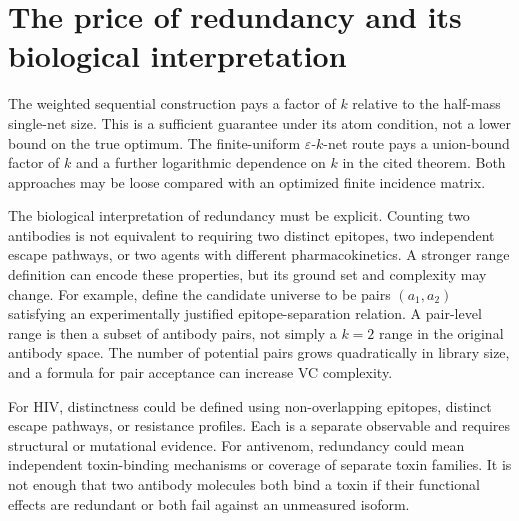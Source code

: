 \documentclass[11pt,a4paper]{article}
\newcommand{\eps}{\varepsilon}
\begin{document}
\section{The price of redundancy and its biological interpretation}
The weighted sequential construction pays a factor of $k$ relative to the half-mass single-net size. This is a sufficient guarantee under its atom condition, not a lower bound on the true optimum. The finite-uniform $\eps$-$k$-net route pays a union-bound factor of $k$ and a further logarithmic dependence on $k$ in the cited theorem. Both approaches may be loose compared with an optimized finite incidence matrix.

The biological interpretation of redundancy must be explicit. Counting two antibodies is not equivalent to requiring two distinct epitopes, two independent escape pathways, or two agents with different pharmacokinetics. A stronger range definition can encode these properties, but its ground set and complexity may change. For example, define the candidate universe to be pairs $(a_1,a_2)$ satisfying an experimentally justified epitope-separation relation. A pair-level range is then a subset of antibody pairs, not simply a $k=2$ range in the original antibody space. The number of potential pairs grows quadratically in library size, and a formula for pair acceptance can increase VC complexity.

For HIV, distinctness could be defined using non-overlapping epitopes, distinct escape pathways, or resistance profiles. Each is a separate observable and requires structural or mutational evidence. For antivenom, redundancy could mean independent toxin-binding mechanisms or coverage of separate toxin families. It is not enough that two antibody molecules both bind a toxin if their functional effects are redundant or both fail against an unmeasured isoform.
\end{document}
